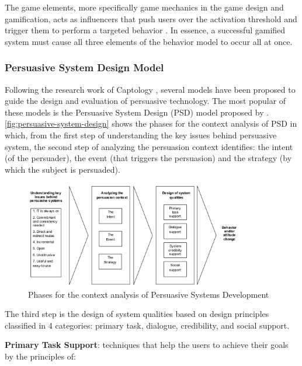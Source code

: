 The game elements, more specifically game mechanics in the game design and gamification, acts as influencers that push users over the activation threshold and trigger them to perform a targeted behavior \cite{Wu2011}. In essence, a successful gamified system must cause all three elements of the behavior model to occur all at once.

\subsubsection{Persuasive System Design Model}
\label{subsubsec:psd-model}

Following the research work of Captology \cite{Fogg2002}, several models have been proposed to guide the design and evaluation of persuasive technology. The most popular of these models is the Persuasive System Design (PSD) model proposed by . \autoref{fig:persuasive-system-design} shows the phases for the context analysis of PSD in which, from the first step of understanding the key issues behind persuasive system, the second step of analyzing the persuasion context identifies: the intent (of the persuader), the event (that triggers the persuasion) and the strategy (by which the subject is persuaded).

\begin{figure}[htb]
 \caption{Phases for the context analysis of Persuasive Systems Development}
 \label{fig:persuasive-system-design}
 \centering
 \includegraphics[width=0.85\textwidth]{images/chap-general-background/persuasive-system-design.png}
\end{figure}

The third step is the design of system qualities based on design principles classified in 4 categories: primary task, dialogue, credibility, and social support.

\textbf{Primary Task Support}: techniques that help the users to achieve their goals by the principles of:

